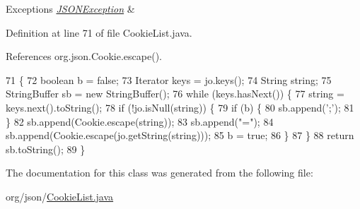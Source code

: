 \begin{DoxyExceptions}{Exceptions}
{\em \hyperlink{classorg_1_1json_1_1_j_s_o_n_exception}{J\-S\-O\-N\-Exception}} & \\
\hline
\end{DoxyExceptions}


Definition at line 71 of file Cookie\-List.\-java.



References org.\-json.\-Cookie.\-escape().


\begin{DoxyCode}
71                                                                       \{
72         \textcolor{keywordtype}{boolean}      b = \textcolor{keyword}{false};
73         Iterator     keys = jo.keys();
74         String       string;
75         StringBuffer sb = \textcolor{keyword}{new} StringBuffer();
76         \textcolor{keywordflow}{while} (keys.hasNext()) \{
77             \textcolor{keywordtype}{string} = keys.next().toString();
78             \textcolor{keywordflow}{if} (!jo.isNull(\textcolor{keywordtype}{string})) \{
79                 \textcolor{keywordflow}{if} (b) \{
80                     sb.append(\textcolor{charliteral}{';'});
81                 \}
82                 sb.append(Cookie.escape(\textcolor{keywordtype}{string}));
83                 sb.append(\textcolor{stringliteral}{"="});
84                 sb.append(Cookie.escape(jo.getString(\textcolor{keywordtype}{string})));
85                 b = \textcolor{keyword}{true};
86             \}
87         \}
88         \textcolor{keywordflow}{return} sb.toString();
89     \}
\end{DoxyCode}


The documentation for this class was generated from the following file\-:\begin{DoxyCompactItemize}
\item 
org/json/\hyperlink{_cookie_list_8java}{Cookie\-List.\-java}\end{DoxyCompactItemize}
